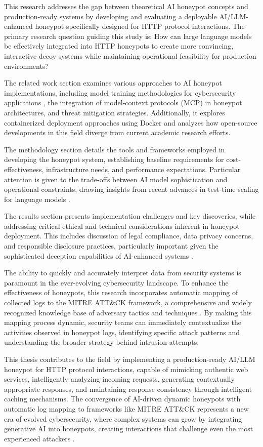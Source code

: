 This research addresses the gap between theoretical AI honeypot concepts and production-ready systems by developing and evaluating a deployable AI/LLM-enhanced honeypot specifically designed for HTTP protocol interactions. The primary research question guiding this study is: How can large language models be effectively integrated into HTTP honeypots to create more convincing, interactive decoy systems while maintaining operational feasibility for production environments?

The related work section examines various approaches to AI honeypot implementations, including model training methodologies for cybersecurity applications \cite{gizzarelli2024}, the integration of model-context protocols (MCP) in honeypot architectures, and threat mitigation strategies. Additionally, it explores containerized deployment approaches using Docker and analyzes how open-source developments in this field diverge from current academic research efforts.

The methodology section details the tools and frameworks employed in developing the honeypot system, establishing baseline requirements for cost-effectiveness, infrastructure needs, and performance expectations. Particular attention is given to the trade-offs between AI model sophistication and operational constraints, drawing insights from recent advances in test-time scaling for language models \cite{muennighoff2025}.

The results section presents implementation challenges and key discoveries, while addressing critical ethical and technical considerations inherent in honeypot deployment. This includes discussion of legal compliance, data privacy concerns, and responsible disclosure practices, particularly important given the sophisticated deception capabilities of AI-enhanced systems \cite{spitzner2003}.

The ability to quickly and accurately interpret data from security systems is paramount in the ever-evolving cybersecurity landscape. To enhance the effectiveness of honeypots, this research incorporates automatic mapping of collected logs to the MITRE ATT\&CK framework, a comprehensive and widely recognized knowledge base of adversary tactics and techniques \cite{gizzarelli2024}. By making this mapping process dynamic, security teams can immediately contextualize the activities observed in honeypot logs, identifying specific attack patterns and understanding the broader strategy behind intrusion attempts.

This thesis contributes to the field by implementing a production-ready AI/LLM honeypot for HTTP protocol interactions, capable of mimicking authentic web services, intelligently analyzing incoming requests, generating contextually appropriate responses, and maintaining response consistency through intelligent caching mechanisms. The convergence of AI-driven dynamic honeypots with automatic log mapping to frameworks like MITRE ATT\&CK represents a new era of evolved cybersecurity, where complex systems can grow by integrating generative AI into honeypots, creating interactions that challenge even the most experienced attackers \cite{gizzarelli2024}.




